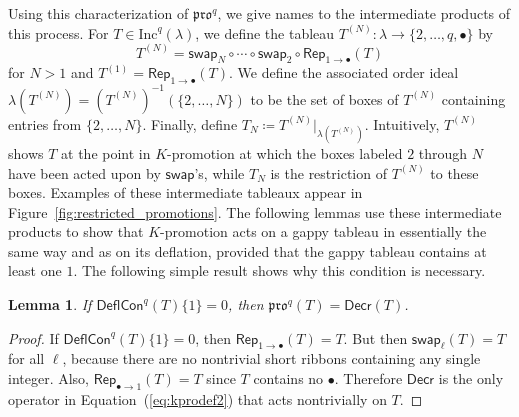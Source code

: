 \documentclass[12pt]{amsart}
\newtheorem{lemma}[theorem]{Lemma}
\theoremstyle{definition}
\theoremstyle{remark}
\numberwithin{equation}{section}
\newcommand{\inc}{\ensuremath{\mathrm{Inc}}}
\newcommand{\pro}{\mathfrak{pro}}
\newcommand{\swap}{\ensuremath{\mathsf{swap}}}
\newcommand{\decr}{\ensuremath{\mathsf{Decr}}}
\newcommand{\rep}{\ensuremath{\mathsf{Rep}}}
\newcommand{\compress}{\ensuremath{\mathsf{DeflCon}}}
\begin{document}
Using this characterization of $\pro^q$, we give names to the intermediate products of this process.
For $T \in \inc^q(\lambda)$, we define the tableau $T^{(N)}: \lambda \rightarrow \lbrace 2, \dots, q, \bullet \rbrace$ by 
\[T^{(N)} = \swap_N \circ \cdots \circ \swap_2 \circ \rep_{1 \rightarrow \bullet}(T)\] for $N > 1$ and $T^{(1)} = \rep_{1 \rightarrow \bullet}(T)$. We define the associated order ideal $\lambda \left( T^{(N)} \right) = \left( T^{(N)} \right)^{-1}(\{2,\dots,N\})$ to be the set of boxes of $T^{(N)}$ containing entries from $\{2,\dots,N\}$. Finally, define $T_N \coloneqq T^{(N)} \vert_{\lambda \left( T^{(N)} \right) }$. Intuitively, $T^{(N)}$ shows $T$ at the point in $K$-promotion at which the boxes labeled $2$ through $N$ have been acted upon by $\swap$'s, while $T_N$ is the restriction of $T^{(N)}$ to these boxes. Examples of these intermediate tableaux appear in Figure~\ref{fig:restricted_promotions}. The following lemmas use these intermediate products to show that $K$-promotion acts on a gappy tableau in essentially the same way and as on its deflation, provided that the gappy tableau contains at least one $1$. The following simple result shows why this condition is necessary.

\begin{lemma}\label{lem:no_ones}
If $\compress^q(T)\lbrace 1 \rbrace = 0$, then $\pro^q(T) = \decr(T)$. 
\end{lemma} 
\begin{proof}
If $\compress^q(T)\lbrace 1 \rbrace = 0$, then $\rep_{1 \rightarrow \bullet}(T) = T$. But then $\swap_\ell(T) = T$ for all $\ell$, because there are no nontrivial short ribbons containing any single integer. Also, $\rep_{\bullet \rightarrow 1}(T) = T$ since $T$ contains no $\bullet$. Therefore $\decr$ is the only operator in Equation~(\ref{eq:kprodef2}) that acts nontrivially on $T$. 
\end{proof}
\end{document}
